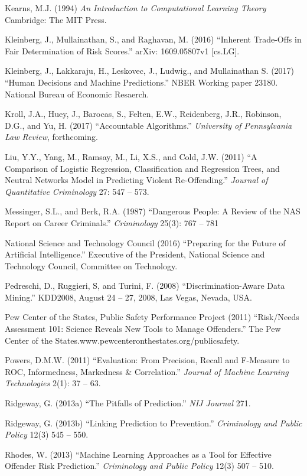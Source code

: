 \documentclass[12pt]{article}
\begin{document}
\begin{description}
\item
Kearns, M.J. (1994) \textit{An Introduction to Computational Learning Theory} Cambridge: The MIT Press.
\item
Kleinberg, J., Mullainathan, S., and Raghavan, M. (2016) ``Inherent Trade-Offs in Fair Determination of Risk Scores.'' arXiv: 1609.05807v1 [cs.LG].
\item
Kleinberg, J., Lakkaraju, H., Leskovec, J., Ludwig., and Mullainathan S. (2017) ``Human Decisions and Machine Predictions.'' NBER Working paper 23180. National Bureau of Economic Resaerch.
\item
Kroll, J.A., Huey, J., Barocas, S., Felten, E.W., Reidenberg, J.R., Robinson, D.G., and Yu, H. (2017) ``Accountable Algorithms.'' \textit{University of Pennsylvania Law Review}, forthcoming.
\item
Liu, Y.Y., Yang, M., Ramsay, M., Li, X.S., and Cold, J.W. (2011) ``A Comparison of Logistic Regression, Classification and Regression Trees, and Neutral Networks Model in Predicting Violent Re-Offending.'' \textit{Journal of Quantitative Criminology} 27: 547 -- 573.
\item
Messinger, S.L., and Berk, R.A. (1987) ``Dangerous People: A Review of the NAS Report on Career Criminals.'' \textit{Criminology} 25(3): 767 -- 781
\item
National Science and Technology Council (2016) ``Preparing for the Future of Artificial Intelligence.'' Executive of the President, National Science and Technology Council, Committee on Technology.
\item
Pedreschi, D., Ruggieri, S, and Turini, F. (2008) ``Discrimination-Aware Data Mining.'' KDD2008, August 24 -- 27, 2008, Las Vegas, Nevada, USA.
\item
Pew Center of the States, Public Safety Performance Project (2011) ``Risk/Needs Assessment 101: Science Reveals New Tools to Manage Offenders.'' The Pew Center of the States.www.pewcenteronthestates.org/publicsafety.
\item
Powers, D.M.W. (2011) ``Evaluation: From Precision, Recall and F-Measure to ROC, Informedness, Markedness \& Correlation.'' \textit{Journal of Machine Learning Technologies} 2(1): 37 -- 63.
\item
Ridgeway, G. (2013a) ``The Pitfalls of Prediction.'' \textit{NIJ Journal} 271.
\item
Ridgeway, G. (2013b) ``Linking Prediction to Prevention.'' \textit{Criminology and Public Policy} 12(3) 545 -- 550. 
\item
Rhodes, W. (2013) ``Machine Learning Approaches as a Tool for Effective Offender Risk Prediction.'' \textit{Criminology and Public Policy} 12(3) 507 -- 510.

\end{description}
\end{document}
